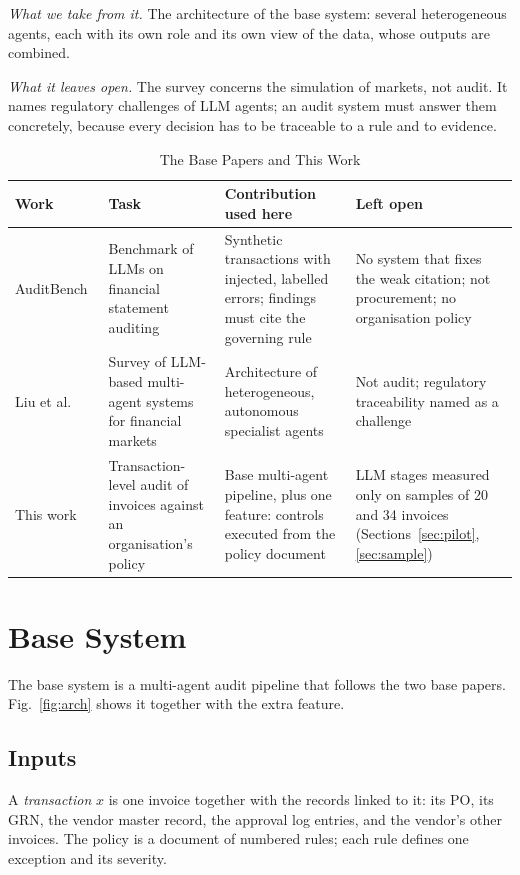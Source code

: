 \documentclass[conference]{IEEEtran}
\begin{document}
\textit{What we take from it.} The architecture of the base system: several heterogeneous agents, each with its own role and its own view of the data, whose outputs are combined.

\textit{What it leaves open.} The survey concerns the simulation of markets, not audit. It names regulatory challenges of LLM agents; an audit system must answer them concretely, because every decision has to be traceable to a rule and to evidence.

\begin{table}[t]
\caption{The Base Papers and This Work}
\label{tab:base}
\centering
\footnotesize
\setlength{\tabcolsep}{4pt}
\renewcommand{\arraystretch}{1.15}
\begin{tabular}{L{3.0cm}L{4.4cm}L{4.6cm}L{4.6cm}}
\toprule
Work & Task & Contribution used here & Left open \\
\midrule
AuditBench~\cite{wang2025auditbench} & Benchmark of LLMs on financial statement auditing & Synthetic transactions with injected, labelled errors; findings must cite the governing rule & No system that fixes the weak citation; not procurement; no organisation policy \\
Liu et al.~\cite{liu2026survey} & Survey of LLM-based multi-agent systems for financial markets & Architecture of heterogeneous, autonomous specialist agents & Not audit; regulatory traceability named as a challenge \\
This work & Transaction-level audit of invoices against an organisation's policy & Base multi-agent pipeline, plus one feature: controls executed from the policy document & LLM stages measured only on samples of 20 and 34 invoices (Sections~\ref{sec:pilot}, \ref{sec:sample}) \\
\bottomrule
\end{tabular}
\end{table}

\section{Base System}
\label{sec:basesys}
The base system is a multi-agent audit pipeline that follows the two base papers. Fig.~\ref{fig:arch} shows it together with the extra feature.

\subsection{Inputs}
A \emph{transaction} $x$ is one invoice together with the records linked to it: its PO, its GRN, the vendor master record, the approval log entries, and the vendor's other invoices. The policy is a document of numbered rules; each rule defines one exception and its severity.
\end{document}
